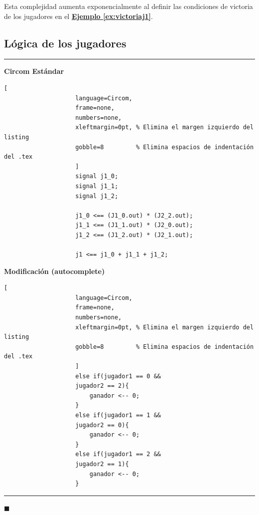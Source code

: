 \documentclass[a4paper,12pt]{report}
\begin{document}
	\vspace{0.2cm}
	\noindent Esta complejidad aumenta exponencialmente al definir las condiciones de victoria de los jugadores en el
	\hyperref[ex:victoriaj1]{\textbf{Ejemplo \ref{ex:victoriaj1}}}. 
	
	\subsection{Lógica de los jugadores}
	\begin{mi_ejemplo}
		\caption{Traducción de la lógica del jugador 1}
		\label{ex:victoriaj1}
		\begin{center}
			\rule{\textwidth}{0.6pt} %
			\begin{minipage}[t][6cm][t]{0.48\textwidth}
				\raggedright %
				\textbf{Circom Estándar} \\
				\vspace{0.2cm}
				\begin{lstlisting}[
					language=Circom, 
					frame=none, 
					numbers=none, 
					xleftmargin=0pt, % Elimina el margen izquierdo del listing
					gobble=8         % Elimina espacios de indentación del .tex
					]
					signal j1_0;
					signal j1_1;
					signal j1_2;
					
					j1_0 <== (J1_0.out) * (J2_2.out);
					j1_1 <== (J1_1.out) * (J2_0.out);
					j1_2 <== (J1_2.out) * (J2_1.out);
					
					j1 <== j1_0 + j1_1 + j1_2;
				\end{lstlisting}
			\end{minipage}
			\hfill
			\begin{minipage}[t][6cm][t]{0.48\textwidth}
				\raggedright %
				\textbf{Modificación (autocomplete)} \\
				\vspace{0.2cm}
				\begin{lstlisting}[
					language=Circom, 
					frame=none, 
					numbers=none, 
					xleftmargin=0pt, % Elimina el margen izquierdo del listing
					gobble=8         % Elimina espacios de indentación del .tex
					]
					else if(jugador1 == 0 && 
					jugador2 == 2){ 
						ganador <-- 0;
					}
					else if(jugador1 == 1 && 
					jugador2 == 0){ 
						ganador <-- 0;
					}
					else if(jugador1 == 2 && 
					jugador2 == 1){ 
						ganador <-- 0;
					}
				\end{lstlisting}
			\end{minipage}
			
			\vspace{1cm}
			\rule{\textwidth}{0.8pt} %
		\end{center}
		
		\hspace*{\fill} $\blacksquare$
	\end{mi_ejemplo}
	
\end{document}
